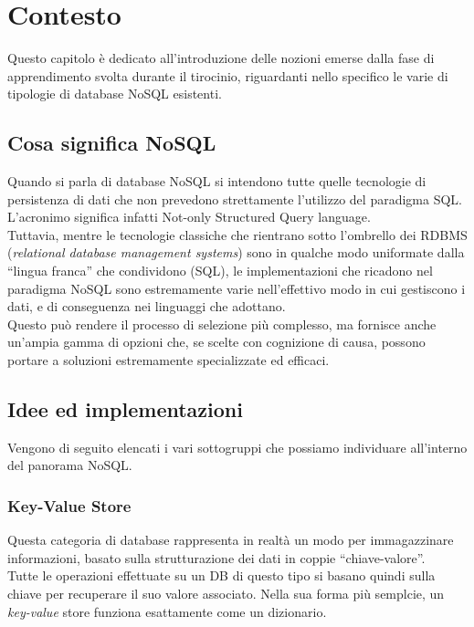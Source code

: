 
\chapter{Contesto}
\label{cap:contesto}

Questo capitolo è dedicato all'introduzione delle nozioni emerse dalla fase di apprendimento svolta durante il tirocinio, riguardanti nello specifico le varie di tipologie di database NoSQL esistenti.\\

\section{Cosa significa NoSQL}
Quando si parla di database NoSQL si intendono tutte quelle tecnologie di persistenza di dati che non prevedono strettamente l'utilizzo del paradigma \gls{SQL}. L'acronimo significa infatti Not-only Structured Query language.\\
Tuttavia, mentre le tecnologie classiche che rientrano sotto l'ombrello dei RDBMS (\textit{relational database management systems}) sono in qualche modo uniformate dalla ``lingua franca'' che condividono (\gls{SQL}), le implementazioni che ricadono nel paradigma NoSQL sono estremamente varie nell'effettivo modo in cui gestiscono i dati, e di conseguenza nei linguaggi che adottano.\\
Questo può rendere il processo di selezione più complesso, ma fornisce anche un'ampia gamma di opzioni che, se scelte con cognizione di causa, possono portare a soluzioni estremamente specializzate ed efficaci.\\


\section{Idee ed implementazioni}
Vengono di seguito elencati i vari sottogruppi che possiamo individuare all'interno del panorama NoSQL.\\

\subsection{Key-Value Store}
Questa categoria di database rappresenta in realtà un modo per immagazzinare informazioni, basato sulla strutturazione dei dati in coppie ``chiave-valore''.\\
Tutte le operazioni effettuate su un DB di questo tipo si basano quindi sulla chiave per recuperare il suo valore associato. Nella sua forma più semplcie, un \textit{key-value} store funziona esattamente come un dizionario.\\

